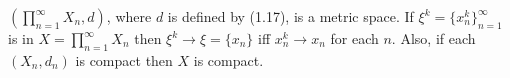 $\left(\prod_{n=1}^{\infty} X_n, d\right)$, where $d$ is defined by (1.17), is a metric space. If $\xi^k = \{x_n^k\}_{n=1}^{\infty}$ is in $X = \prod_{n=1}^{\infty} X_n$ then $\xi^k \rightarrow \xi = \{x_n\}$ iff $x_n^k \rightarrow x_n$ for each $n$. Also, if each $(X_n, d_n)$ is compact then $X$ is compact.